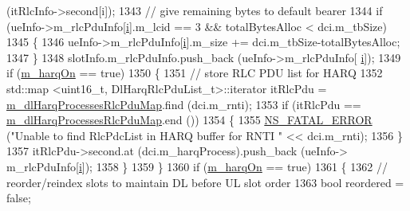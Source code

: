 \begin{DoxyCode}
{       (itRlcInfo->second[i]);}
1343                                 \textcolor{comment}{// give remaining bytes to default bearer}
1344                                 \textcolor{keywordflow}{if} (ueInfo->m\_rlcPduInfo[\hyperlink{bernuolliDistribution_8m_a6f6ccfcf58b31cb6412107d9d5281426}{i}].m\_lcid == 3 && totalBytesAlloc < dci.m\_tbSize)
1345                                 \{
1346                                         ueInfo->m\_rlcPduInfo[\hyperlink{bernuolliDistribution_8m_a6f6ccfcf58b31cb6412107d9d5281426}{i}].m\_size += dci.m\_tbSize-totalBytesAlloc;
1347                                 \}
1348                                 slotInfo.m\_rlcPduInfo.push\_back (ueInfo->m\_rlcPduInfo[
      \hyperlink{bernuolliDistribution_8m_a6f6ccfcf58b31cb6412107d9d5281426}{i}]);
1349                                 \textcolor{keywordflow}{if} (\hyperlink{classns3_1_1MmWaveFlexTtiMaxWeightMacScheduler_af63eec946bdf0fb2db0c66104e95f1a6}{m\_harqOn} == \textcolor{keyword}{true})
1350                                 \{
1351                                         \textcolor{comment}{// store RLC PDU list for HARQ}
1352                                         std::map <uint16\_t, DlHarqRlcPduList\_t>::iterator itRlcPdu =  
      \hyperlink{classns3_1_1MmWaveFlexTtiMaxWeightMacScheduler_aa9cdf43f057d1bd8e1cfcf2a21ea89f0}{m\_dlHarqProcessesRlcPduMap}.find (dci.m\_rnti);
1353                                         \textcolor{keywordflow}{if} (itRlcPdu == 
      \hyperlink{classns3_1_1MmWaveFlexTtiMaxWeightMacScheduler_aa9cdf43f057d1bd8e1cfcf2a21ea89f0}{m\_dlHarqProcessesRlcPduMap}.end ())
1354                                         \{
1355                                                 \hyperlink{group__fatal_ga5131d5e3f75d7d4cbfd706ac456fdc85}{NS\_FATAL\_ERROR} (\textcolor{stringliteral}{"Unable to find RlcPdcList in
       HARQ buffer for RNTI "} << dci.m\_rnti);
1356                                         \}
1357                                         itRlcPdu->second.at (dci.m\_harqProcess).push\_back (ueInfo->
      m\_rlcPduInfo[\hyperlink{bernuolliDistribution_8m_a6f6ccfcf58b31cb6412107d9d5281426}{i}]);
1358                                 \}
1359                         \}
1360                         \textcolor{keywordflow}{if} (\hyperlink{classns3_1_1MmWaveFlexTtiMaxWeightMacScheduler_af63eec946bdf0fb2db0c66104e95f1a6}{m\_harqOn} == \textcolor{keyword}{true})
1361                         \{
1362                                 \textcolor{comment}{// reorder/reindex slots to maintain DL before UL slot order}
1363                                 \textcolor{keywordtype}{bool} reordered = \textcolor{keyword}{false};

\end{DoxyCode}
